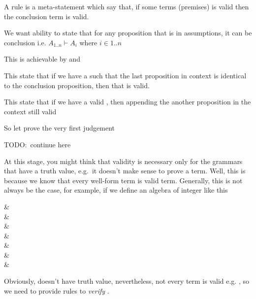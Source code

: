 \documentclass[master.tex]{subfiles}
\begin{document}
A rule is a meta-statement which say that, if some terms (premises) is valid
then the conclusion term is valid.

We want ability to state that for any proposition that is in assumptions, it can
be conclusion i.e. $A_{1..n} \vdash A_i$ where $i \in {1..n}$

This is achievable by  and 


This state that if we have a  such that the last proposition in
context is identical to the conclusion proposition, then that 
is valid.


This state that if we have a valid , then appending the another
proposition in the context still valid

So let prove the very first judgement


TODO:\ continue here

At this stage, you might think that validity is necessary only for the
grammars that have a truth value, e.g.\ it doesn't make sense to prove a
 term. Well, this is because we know that every well-form
 term is valid term. Generally, this is not always be the
case, for example, if we define an algebra of integer like this

 {
    \kVarRegex &  \\

    \kChoice &  \\

    \kChoice &  \\

    \kChoice &  \\

    \kChoice &  \\

    \kChoice &  \\

    \kChoice &  \\
}

Obviously,  doesn't have truth value, nevertheless, not every
 term is valid e.g. , so
we need to provide rules to \emph{verify} .
\end{document}
